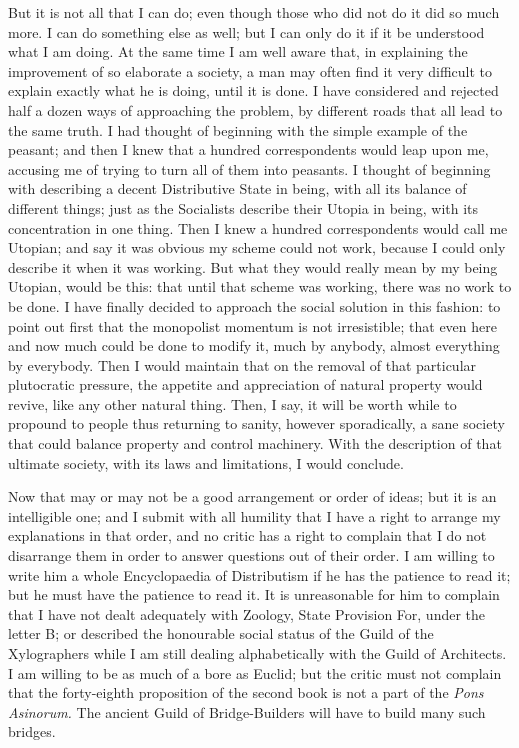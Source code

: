 \documentclass{book}
\begin{document}
But it is not all that I can do; even though those who did not do it did so much more. I can do something else as well; but I can only do it if it be understood what I am doing. At the same time I am well aware that, in explaining the improvement of so elaborate a society, a man may often find it very difficult to explain exactly what he is doing, until it is done. I have considered and rejected half a dozen ways of approaching the problem, by different roads that all lead to the same truth. I had thought of beginning with the simple example of the peasant; and then I knew that a hundred correspondents would leap upon me, accusing me of trying to turn all of them into peasants. I thought of beginning with describing a decent Distributive State in being, with all its balance of different things; just as the Socialists describe their Utopia in being, with its concentration in one thing. Then I knew a hundred correspondents would call me Utopian; and say it was obvious my scheme could not work, because I could only describe it when it was working. But what they would really mean by my being Utopian, would be this: that until that scheme was working, there was no work to be done. I have finally decided to approach the social solution in this fashion: to point out first that the monopolist momentum is not irresistible; that even here and now much could be done to modify it, much by anybody, almost everything by everybody. Then I would maintain that on the removal of that particular plutocratic pressure, the appetite and appreciation of natural property would revive, like any other natural thing. Then, I say, it will be worth while to propound to people thus returning to sanity, however sporadically, a sane society that could balance property and control machinery. With the description of that ultimate society, with its laws and limitations, I would conclude.

Now that may or may not be a good arrangement or order of ideas; but it is an intelligible one; and I submit with all humility that I have a right to arrange my explanations in that order, and no critic has a right to complain that I do not disarrange them in order to answer questions out of their order. I am willing to write him a whole Encyclopaedia of Distributism if he has the patience to read it; but he must have the patience to read it. It is unreasonable for him to complain that I have not dealt adequately with Zoology, State Provision For, under the letter B; or described the honourable social status of the Guild of the Xylographers while I am still dealing alphabetically with the Guild of Architects. I am willing to be as much of a bore as Euclid; but the critic must not complain that the forty-eighth proposition of the second book is not a part of the \emph{Pons Asinorum.} The ancient Guild of Bridge-Builders will have to build many such bridges.
\end{document}
